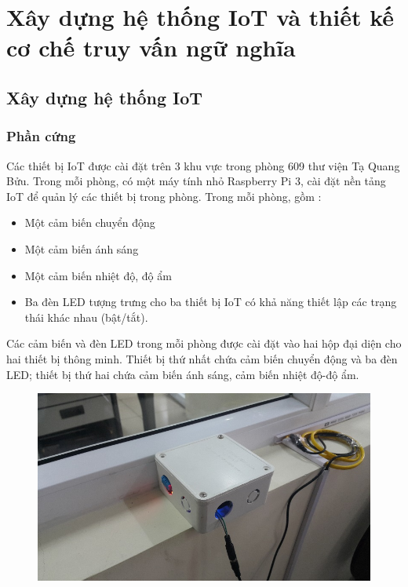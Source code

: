\newcommand{\blank}[1]{\hspace*{#1}\linebreak[0]}
\chapter{Xây dựng hệ thống IoT và thiết kế cơ chế truy vấn ngữ nghĩa}

\section{Xây dựng hệ thống IoT}
\subsection{Phần cứng}

Các thiết bị IoT được cài đặt trên 3 khu vực trong phòng 609 thư viện Tạ Quang Bửu. Trong mỗi phòng, có một máy tính nhỏ Raspberry Pi 3, cài đặt nền tảng IoT để quản lý các thiết bị trong phòng. Trong mỗi phòng, gồm :
\begin{itemize}
	\item Một cảm biến chuyển động
	\item Một cảm biến ánh sáng
	\item Một cảm biến nhiệt độ, độ ẩm
	\item Ba đèn LED tượng trưng cho ba thiết bị IoT có khả năng thiết lập các trạng thái khác nhau (bật/tắt).
\end{itemize}
Các cảm biến và đèn LED trong mỗi phòng được cài đặt vào hai hộp đại diện cho hai thiết bị thông minh. Thiết bị thứ nhất chứa cảm biến chuyển động và ba đèn LED; thiết bị thứ hai chứa cảm biến ánh sáng, cảm biến nhiệt độ-độ ẩm. 
\clearpage

\begin{figure}
	\center
	\includegraphics[scale=1]{image/hop_1}
	\label{fig:2hop}
\end{figure}

